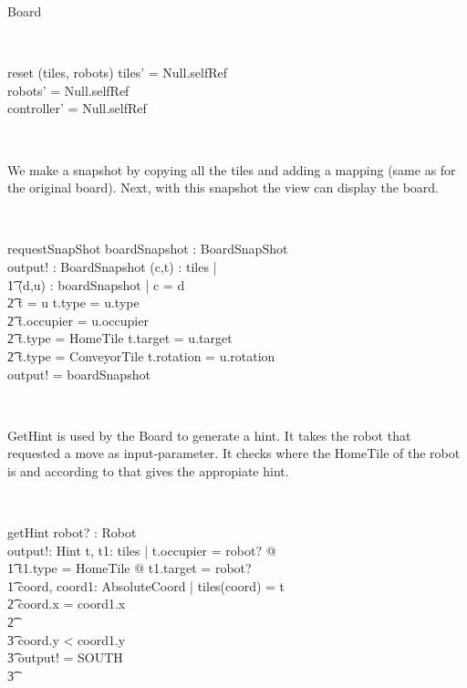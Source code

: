 \begin{class}{Board}
\begin{classcom}
\end{classcom} \\
\begin{schema}{reset}
\Delta (tiles, robots)
\where
tiles' = Null.selfRef \\
robots' = Null.selfRef \\
controller' = Null.selfRef
\end{schema} \\
\znewpage
\begin{classcom}
We make a snapshot by copying all the tiles and adding a mapping (same as for the original board). Next, with this snapshot the view can display the board.
\end{classcom} \\
\begin{schema}{requestSnapShot}
boardSnapshot : BoardSnapShot \\
output! : BoardSnapshot
\where
\forall (c,t) : tiles |  \\ \t1
\exists (d,u) : boardSnapshot | c = d \: \wedge \\ \t2 t \not = u \wedge t.type = u.type \: \wedge \\ \t2 t.occupier = u.occupier \: \wedge \\ \t2 t.type = HomeTile \Rightarrow t.target = u.target \: \wedge \\ \t2 t.type = ConveyorTile \Rightarrow t.rotation = u.rotation \\
output! = boardSnapshot
\end{schema} \\
\begin{classcom}
GetHint is used by the Board to generate a hint. It takes the robot that requested a move as input-parameter. It checks where the HomeTile of the robot is and according to that gives the appropiate hint.
\end{classcom} \\
\begin{schema}{getHint}
robot? : Robot \\
output!: Hint
\where
\exists t, t1: \ran tiles | t.occupier = robot? @\\ \t1
t1.type = HomeTile @ t1.target = robot? \\ \t1
\exists coord, coord1: AbsoluteCoord | tiles(coord) = t \\ \t2
\IF coord.x = coord1.x \\ \t2
\THEN \\ \t3
\IF coord.y < coord1.y \\ \t3
\THEN output! = SOUTH \\ \t3

\end{schema}
\end{class}
